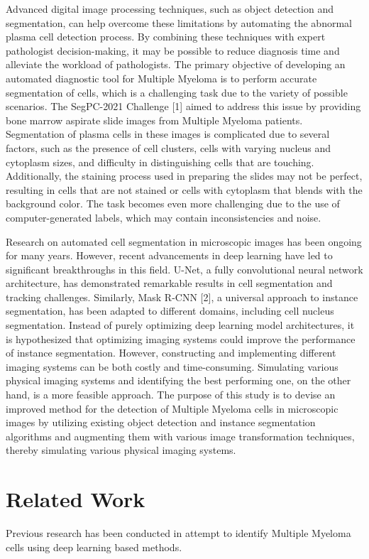 \documentclass{article}
\begin{document}
Advanced digital image processing techniques, such as object detection and segmentation, can help overcome these limitations by automating the abnormal plasma cell detection process. By combining these techniques with expert pathologist decision-making, it may be possible to reduce diagnosis time and alleviate the workload of pathologists. The primary objective of developing an automated diagnostic tool for Multiple Myeloma is to perform accurate segmentation of cells, which is a challenging task due to the variety of possible scenarios. The SegPC-2021 Challenge [1] aimed to address this issue by providing bone marrow aspirate slide images from Multiple Myeloma patients. Segmentation of plasma cells in these images is complicated due to several factors, such as the presence of cell clusters, cells with varying nucleus and cytoplasm sizes, and difficulty in distinguishing cells that are touching. Additionally, the staining process used in preparing the slides may not be perfect, resulting in cells that are not stained or cells with cytoplasm that blends with the background color. The task becomes even more challenging due to the use of computer-generated labels, which may contain inconsistencies and noise.

Research on automated cell segmentation in microscopic images has been ongoing for many years. However, recent advancements in deep learning have led to significant breakthroughs in this field. U-Net, a fully convolutional neural network architecture, has demonstrated remarkable results in cell segmentation and tracking challenges. Similarly, Mask R-CNN [2], a universal approach to instance segmentation, has been adapted to different domains, including cell nucleus segmentation. Instead of purely optimizing deep learning model architectures, it is hypothesized that optimizing imaging systems could improve the performance of instance segmentation. However, constructing and implementing different imaging systems can be both costly and time-consuming. Simulating various physical imaging systems and identifying the best performing one, on the other hand, is a more feasible approach. The purpose of this study is to devise an improved method for the detection of Multiple Myeloma cells in microscopic images by utilizing existing object detection and instance segmentation algorithms and augmenting them with various image transformation techniques, thereby simulating various physical imaging systems.

\section{Related Work}
Previous research has been conducted in attempt to identify Multiple Myeloma cells using deep learning based methods.
\end{document}
